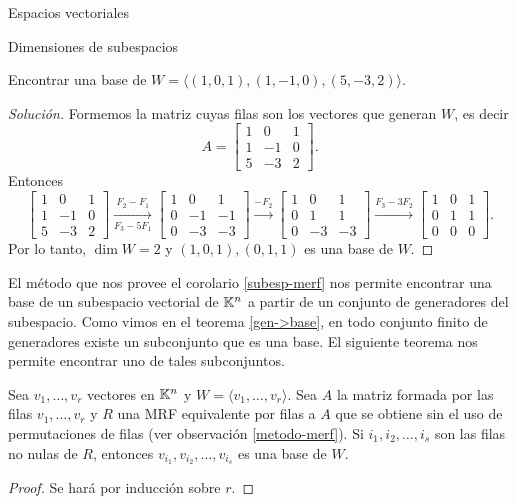 \begin{chapter}{Espacios vectoriales}
\begin{section}{Dimensiones de subespacios}
    \begin{ejemplo*}\label{ej-4.5}
        Encontrar una base  de $W= \langle (1,0,1), (1,-1,0), (5,-3,2)\rangle$. 
    \end{ejemplo*}
    \begin{proof}[Solución]
        Formemos la matriz cuyas filas son los vectores que generan $W$,  es decir 
        $$
        A = \begin{bmatrix} 1&0&1 \\ 1&-1&0 \\ 5&-3&2 \end{bmatrix}.
        $$
        Entonces
        \begin{equation*}
        \begin{bmatrix}1&0&1 \\ 1&-1&0 \\ 5&-3&2  \end{bmatrix}
        \underset{F_3-5F_1}{\stackrel{F_2- F_1}{\longrightarrow}} 
        \begin{bmatrix}1&0&1 \\ 0&-1&-1 \\ 0&-3&-3\end{bmatrix}
        \stackrel{-F_2}{\longrightarrow} 
        \begin{bmatrix}1&0&1 \\ 0&1&1 \\ 0&-3&-3\end{bmatrix}
        \stackrel{F_3 - 3F_2}{\longrightarrow}
        \begin{bmatrix}1&0&1 \\ 0&1&1 \\ 0&0&0\end{bmatrix}.
        \end{equation*}
        Por lo tanto, $\dim W =2$ y $(1,0,1), (0,1,1)$ es una base de  $W$.
    \end{proof}
    
    El método que nos provee el corolario  \ref{subesp-merf} nos permite encontrar una base de un subespacio vectorial de $\mathbb K^n$ a partir de un conjunto de generadores del subespacio. Como vimos en el teorema \ref{gen->base},  en todo conjunto finito de generadores existe un subconjunto que es una base. El siguiente teorema nos permite encontrar uno de tales subconjuntos. 

    
    \begin{teorema}
        Sea $v_1,\ldots, v_r$ vectores en $\mathbb K^n$ y $W = \langle  v_1,\ldots, v_r \rangle$. Sea $A$ la matriz formada por las filas $v_1,\ldots, v_r$ y $R$ una MRF equivalente por filas a $A$ que se obtiene sin el uso de permutaciones de filas (ver observación \ref{metodo-merf}). Si $i_1,i_2,\ldots,i_s$ son las filas no nulas de $R$,  entonces $v_{i_1},v_{i_2},\ldots,v_{i_s}$ es una base de $W$.
    \end{teorema}
    \begin{proof}
        Se hará por inducción sobre $r$. 
        

\end{proof}
\end{section}
\end{chapter}
